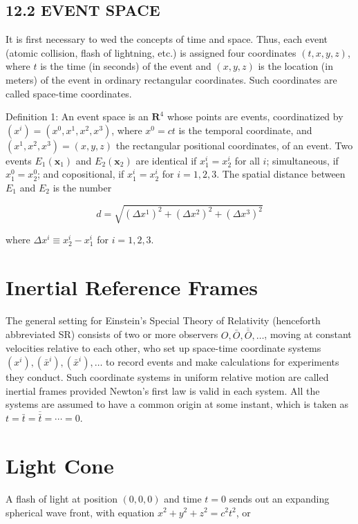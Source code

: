 \documentclass[10pt]{article}
\begin{document}
\subsection*{12.2 EVENT SPACE}
It is first necessary to wed the concepts of time and space. Thus, each event (atomic collision, flash of lightning, etc.) is assigned four coordinates $(t, x, y, z)$, where $t$ is the time (in seconds) of the event and $(x, y, z)$ is the location (in meters) of the event in ordinary rectangular coordinates. Such coordinates are called space-time coordinates.

Definition 1: An event space is an $\mathbf{R}^{4}$ whose points are events, coordinatized by $\left(x^{i}\right)=\left(x^{0}, x^{1}, x^{2}, x^{3}\right)$, where $x^{0}=c t$ is the temporal coordinate, and $\left(x^{1}, x^{2}, x^{3}\right)=(x, y, z)$ the rectangular positional coordinates, of an event. Two events $E_{1}\left(\mathbf{x}_{1}\right)$ and $E_{2}\left(\mathbf{x}_{2}\right)$ are identical if $x_{1}^{i}=x_{2}^{i}$ for all $i$; simultaneous, if $x_{1}^{0}=x_{2}^{0}$; and copositional, if $x_{1}^{i}=x_{2}^{i}$ for $i=1,2,3$. The spatial distance between $E_{1}$ and $E_{2}$ is the number


\begin{equation*}
d=\sqrt{\left(\Delta x^{1}\right)^{2}+\left(\Delta x^{2}\right)^{2}+\left(\Delta x^{3}\right)^{2}} \tag{12.1}
\end{equation*}


where $\Delta x^{i} \equiv x_{2}^{i}-x_{1}^{i}$ for $i=1,2,3$.

\section*{Inertial Reference Frames}
The general setting for Einstein's Special Theory of Relativity (henceforth abbreviated SR) consists of two or more observers $O, \bar{O}, \overline{\bar{O}}, \ldots$, moving at constant velocities relative to each other, who set up space-time coordinate systems $\left(x^{i}\right),\left(\bar{x}^{i}\right),\left(\bar{x}^{i}\right), \ldots$ to record events and make calculations for experiments they conduct. Such coordinate systems in uniform relative motion are called inertial frames provided Newton's first law is valid in each system. All the systems are assumed to have a common origin at some instant, which is taken as $t=\bar{t}=\overline{\bar{t}}=\cdots=0$.

\section*{Light Cone}
A flash of light at position $(0,0,0)$ and time $t=0$ sends out an expanding spherical wave front, with equation $x^{2}+y^{2}+z^{2}=c^{2} t^{2}$, or
\end{document}
